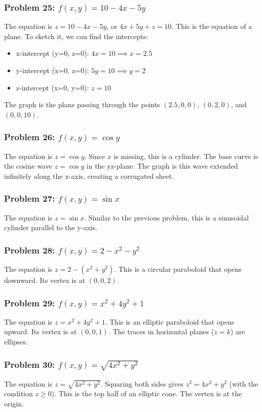 \documentclass{article}
\begin{document}
\subsubsection{Problem 25: $f(x, y) = 10 - 4x - 5y$}
The equation is $z = 10 - 4x - 5y$, or $4x + 5y + z = 10$. This is the equation of a plane. To sketch it, we can find the intercepts:
\begin{itemize}
    \item x-intercept (y=0, z=0): $4x = 10 \implies x = 2.5$
    \item y-intercept (x=0, z=0): $5y = 10 \implies y = 2$
    \item z-intercept (x=0, y=0): $z = 10$
\end{itemize}
The graph is the plane passing through the points $(2.5, 0, 0)$, $(0, 2, 0)$, and $(0, 0, 10)$.

\subsubsection{Problem 26: $f(x, y) = \cos y$}
The equation is $z = \cos y$. Since $x$ is missing, this is a cylinder. The base curve is the cosine wave $z = \cos y$ in the yz-plane. The graph is this wave extended infinitely along the x-axis, creating a corrugated sheet.

\subsubsection{Problem 27: $f(x, y) = \sin x$}
The equation is $z = \sin x$. Similar to the previous problem, this is a sinusoidal cylinder parallel to the y-axis.

\subsubsection{Problem 28: $f(x, y) = 2 - x^2 - y^2$}
The equation is $z = 2 - (x^2 + y^2)$. This is a circular paraboloid that opens downward. Its vertex is at $(0, 0, 2)$.

\subsubsection{Problem 29: $f(x, y) = x^2 + 4y^2 + 1$}
The equation is $z = x^2 + 4y^2 + 1$. This is an elliptic paraboloid that opens upward. Its vertex is at $(0, 0, 1)$. The traces in horizontal planes ($z=k$) are ellipses.

\subsubsection{Problem 30: $f(x, y) = \sqrt{4x^2 + y^2}$}
The equation is $z = \sqrt{4x^2 + y^2}$. Squaring both sides gives $z^2 = 4x^2 + y^2$ (with the condition $z \ge 0$). This is the top half of an elliptic cone. The vertex is at the origin.
\end{document}
